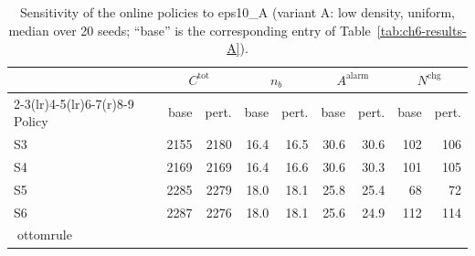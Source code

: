 \begin{table}[htbp]
\centering
\caption{Sensitivity of the online policies to eps10_A (variant A: low density, uniform,
median over 20 seeds; ``base'' is the corresponding entry of
Table~\ref{tab:ch6-results-A}).}
\label{tab:ch6-sens-A-eps10}
\footnotesize
\begin{tabular}{@{}l rr rr rr rr@{}}
\toprule
& \multicolumn{2}{c}{$C^{\mathrm{tot}}$} & \multicolumn{2}{c}{$n_b$}
  & \multicolumn{2}{c}{$A^{\mathrm{alarm}}$} & \multicolumn{2}{c}{$N^{\mathrm{chg}}$} \\
\cmidrule(r){2-3}\cmidrule(lr){4-5}\cmidrule(lr){6-7}\cmidrule(r){8-9}
Policy & base & pert. & base & pert. & base & pert. & base & pert. \\
\midrule

S3 & 2155 & 2180 & 16.4 & 16.5 & 30.6 & 30.6 & 102 & 106 \\
S4 & 2169 & 2169 & 16.4 & 16.6 & 30.6 & 30.3 & 101 & 105 \\
S5 & 2285 & 2279 & 18.0 & 18.1 & 25.8 & 25.4 & 68 & 72 \\
S6 & 2287 & 2276 & 18.0 & 18.1 & 25.6 & 24.9 & 112 & 114 \\
ottomrule
\end{tabular}
\end{table}
